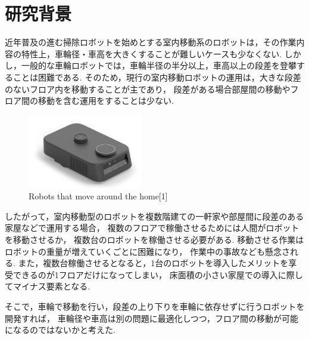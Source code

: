 \documentclass[dvipdfmx]{jsarticle}
\begin{document}

\section{研究背景}
近年普及の進む掃除ロボットを始めとする室内移動系のロボットは，その作業内容の特性上，車輪径・車高を大きくすることが難しいケースも少なくない.
しかし，一般的な車輪ロボットでは，車輪半径の半分以上，車高以上の段差を登攀することは困難である.
そのため，現行の室内移動ロボットの運用は，大きな段差のないフロア内を移動することが主であり，
段差がある場合部屋間の移動やフロア間の移動を含む運用をすることは少ない.
\begin{figure}[H]
  \centering
  \includegraphics[width=50mm]{image/mn0201_kachaka_006}
  \caption{Robots that move around the home[1]}
  
  \label{fig:runba}
\end{figure}
したがって，室内移動型のロボットを複数階建ての一軒家や部屋間に段差のある家屋などで運用する場合，
複数のフロアで稼働させるためには人間がロボットを移動させるか，
複数台のロボットを稼働させる必要がある.
移動させる作業はロボットの重量が増えていくごとに困難になり，
作業中の事故なども懸念される.
また，複数台稼働させるとなると，1台のロボットを導入したメリットを享受できるのが1フロアだけになってしまい，
床面積の小さい家屋での導入に際してマイナス要素となる.

そこで，車輪で移動を行い，段差の上り下りを車輪に依存せずに行うロボットを開発すれば，
車輪径や車高は別の問題に最適化しつつ，フロア間の移動が可能になるのではないかと考えた.
\end{document}

